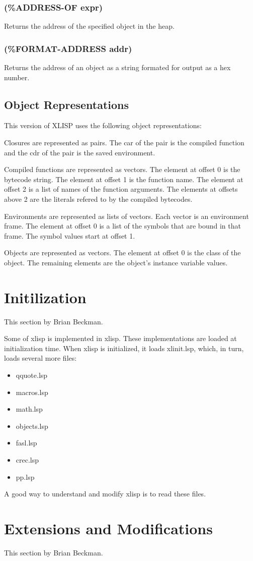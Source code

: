 \documentclass[11pt]{article}
\begin{document}
\subsubsection{(\%ADDRESS-OF expr)}
\label{sec-4-45-9}

Returns the address of the specified object in the heap.
\subsubsection{(\%FORMAT-ADDRESS addr)}
\label{sec-4-45-10}

Returns the address of an object as a string formated for output as a
hex number.
\subsection{Object Representations}
\label{sec-4-46}

This version of XLISP uses the following object representations:

Closures are represented as pairs.  The car of the pair is the
compiled function and the cdr of the pair is the saved environment.

Compiled functions are represented as vectors.  The element at offset
0 is the bytecode string.  The element at offset 1 is the function
name.  The element at offset 2 is a list of names of the function
arguments.  The elements at offsets above 2 are the literals refered
to by the compiled bytecodes.

Environments are represented as lists of vectors.  Each vector is an
environment frame.  The element at offset 0 is a list of the symbols
that are bound in that frame.  The symbol values start at offset 1.

Objects are represented as vectors.  The element at offset 0 is the
class of the object.  The remaining elements are the object's instance
variable values.
\section{Initilization}
\label{sec-5}

This section by Brian Beckman.

Some of xlisp is implemented in xlisp.  These implementations are
loaded at initialization time.  When xlisp is initialized, it loads
xlinit.lsp, which, in turn, loads several more files:
\begin{itemize}
\item qquote.lsp
\item macros.lsp
\item math.lsp
\item objects.lsp
\item fasl.lsp
\item crec.lsp
\item pp.lsp
\end{itemize}

A good way to understand and modify xlisp is to read these files.
\section{Extensions and Modifications}
\label{sec-6}

This section by Brian Beckman.
\end{document}
